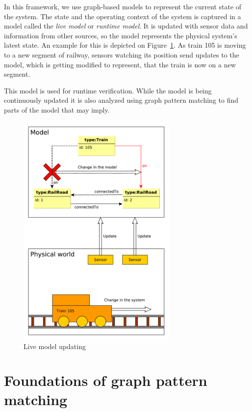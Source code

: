 In this framework, we use graph-based models to represent the current state of the system. 
The state and the operating context of the system is captured in a model called the \emph{live model} or \emph{runtime model}.
It is updated with sensor data and information from other sources, so the model represents the physical system's latest state.
An example for this is depicted on Figure~\ref{fig:live-models}. As train 105 is moving to a new segment of railway, sensors watching its position send updates to the model, which is getting modified to represent, that the train is now on a new segment.


This model is used for runtime verification.
While the model is being continuously updated it is also analyzed using graph pattern matching to find parts of the model that may imply.


\begin{figure}[H]
	\begin{center}
		\includegraphics[width=0.7\textwidth]{figures/live-models.pdf}
		\caption{Live model updating}
		\label{fig:live-models}
	\end{center}
\end{figure}

\section{Foundations of graph pattern matching}
\label{section:gpmc}

